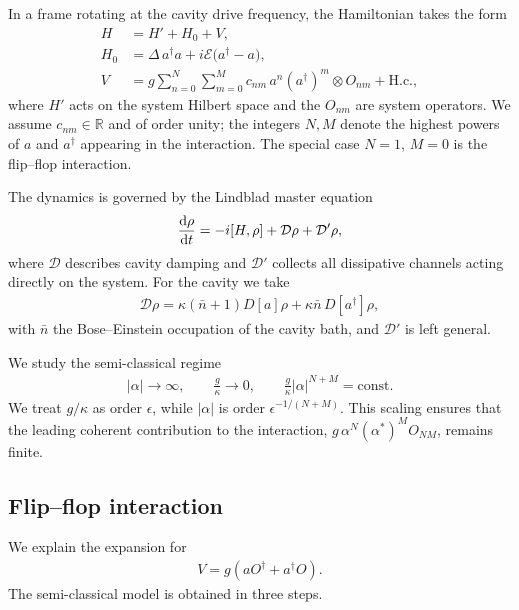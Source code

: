 \documentclass[aps,twocolumn,10pt,prl,floatfix,nofootinbib, superscriptaddress]{revtex4-2}
\newcommand{\nb}{\bar{n}}
\begin{document}
In a frame rotating at the cavity drive frequency, the Hamiltonian takes the form
\begin{align}
H &= H' + H_0 + V, \\
H_0 &= \Delta\, a^\dagger a
+ i\mathcal{E}\big(a^\dagger - a\big), \\
V &=
g \sum_{n=0}^N \sum_{m=0}^M
c_{nm}\, a^{n}(a^\dagger)^m \otimes O_{nm}
+ \text{H.c.},
\label{eq:general-interaction}
\end{align}
where $H'$ acts on the system Hilbert space and the $O_{nm}$ are system operators.
We assume $c_{nm}\in\mathbb{R}$ and of order unity; the integers $N,M$ denote the highest powers of $a$ and $a^\dagger$ appearing in the interaction.
The special case $N=1$, $M=0$ is the flip--flop interaction.

The dynamics is governed by the Lindblad master equation
\begin{align}
\dv{\rho}{t} = -i[H,\rho]
+ \mathcal{D}\rho + \mathcal{D}'\rho,
\end{align}
where $\mathcal{D}$ describes cavity damping and $\mathcal{D}'$ collects all dissipative channels acting directly on the system.
For the cavity we take
\begin{align}
\mathcal{D}\rho
= \kappa(\nb+1)D[a]\rho
+ \kappa\nb\,D[a^\dagger]\rho,
\end{align}
with $\nb$ the Bose--Einstein occupation of the cavity bath, and $\mathcal{D}'$ is left general.

We study the semi-classical regime
\begin{align}
\big|\alpha\big|\to\infty, \qquad \frac{g}{\kappa}\to0, \qquad \frac{g}{\kappa} \big|\alpha\big|^{N+M} =\text{const.}
\label{eq:semi-classical-limit}
\end{align}
We treat $g/\kappa$ as order $\epsilon$, while $|\alpha|$ is order $\epsilon^{-1/(N+M)}$.
This scaling ensures that the leading coherent contribution to the interaction,
$g\,\alpha^N(\alpha^*)^M O_{NM}$, remains finite.

\subsection{Flip--flop interaction}
We explain the expansion for
\begin{align}
V = g(aO^\dagger + a^\dagger O).
\end{align}
The semi-classical model is obtained in three steps.
\end{document}
